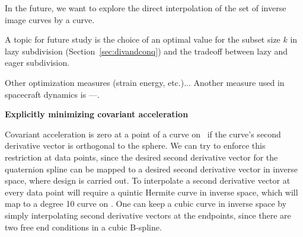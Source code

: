 In the future, we want to explore the direct interpolation of the set
of inverse image curves by a curve.

A topic for future study is the choice of an optimal value
for the subset size $k$ in lazy subdivision (Section~\ref{sec:divandconq})
and the tradeoff between lazy and eager subdivision.

Other optimization measures (strain energy, etc.)...
Another measure used in spacecraft dynamics is ---.

{\bf Explicitly minimizing covariant acceleration}

Covariant acceleration is zero at a point of a curve on \ if the curve's
second derivative vector is orthogonal to the sphere.
We can try to enforce this restriction at data points,
since the desired second derivative vector for the quaternion spline
can be mapped to a desired second derivative vector in inverse space,
where design is carried out.
To interpolate a second derivative vector at every data point will require
a quintic Hermite curve in inverse space, which will map to a degree 10
curve on .
One can keep a cubic curve in inverse space by simply interpolating
second derivative vectors at the endpoints, since there are two free
end conditions in a cubic B-spline.

